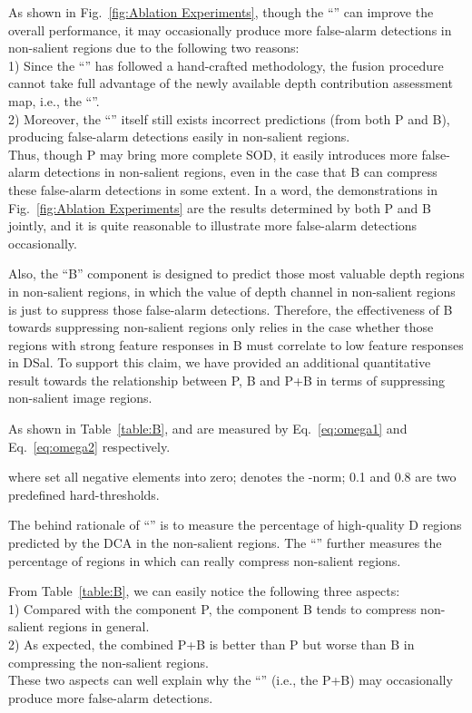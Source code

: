 \documentclass[journal]{IEEEtran}
\begin{document}
As shown in Fig.~\ref{fig:Ablation Experiments}, though the ``'' can improve the overall performance, it may occasionally produce more false-alarm detections in non-salient regions due to the following two reasons:\\
1) Since the ``'' has followed a hand-crafted methodology, the fusion procedure cannot take full advantage of the newly available depth contribution assessment map, i.e., the ``''.\\
2) Moreover, the ``'' itself still exists incorrect predictions (from both P and B), producing false-alarm detections easily in non-salient regions.\\
Thus, though P may bring more complete SOD, it easily introduces more false-alarm detections in non-salient regions, even in the case that B can compress these false-alarm detections in some extent.
In a word, the demonstrations in Fig.~\ref{fig:Ablation Experiments} are the results determined by both P and B jointly, and it is quite reasonable to illustrate more false-alarm detections occasionally.

Also, the ``B'' component is designed to predict those most valuable depth regions in non-salient regions, in which the value of depth channel in non-salient regions is just to suppress those false-alarm detections.
Therefore, the effectiveness of B towards suppressing non-salient regions only relies in the case whether those regions with strong feature responses in B must correlate to low feature responses in DSal.
To support this claim, we have provided an additional quantitative result towards the relationship between P, B and P+B in terms of suppressing non-salient image regions.

As shown in Table~\ref{table:B},  and  are measured by Eq.~\ref{eq:omega1} and Eq.~\ref{eq:omega2} respectively.




where  set all negative elements into zero;  denotes the -norm; 0.1 and 0.8 are two predefined hard-thresholds.

The behind rationale of ``'' is to measure the percentage of high-quality D regions predicted by the DCA in the non-salient regions.
The ``'' further measures the percentage of regions in  which can really compress non-salient regions.

From Table~\ref{table:B}, we can easily notice the following three aspects:\\
1) Compared with the component P, the component B tends to compress non-salient regions in general.\\
2) As expected, the combined P+B is better than P but worse than B in compressing the non-salient regions.\\
These two aspects can well explain why the ``'' (i.e., the P+B) may occasionally produce more false-alarm detections.
\end{document}

